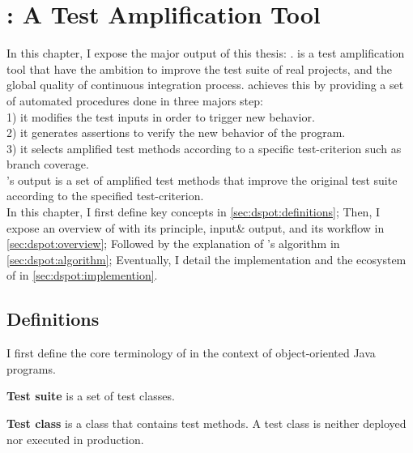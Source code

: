 \chapter{\dspot: A Test Amplification Tool}
\label{chapter:dspot}

\begin{chaptersummary}
		In this chapter, I expose the major output of this thesis: \dspot.
		\dspot is a test amplification tool that have the ambition to improve the test suite of real projects, and the global quality of continuous integration process.
		\dspot achieves this by providing a set of automated procedures done in three majors step:\\
		1) it modifies the test inputs in order to trigger new behavior.\\
		2) it generates assertions to verify the new behavior of the program.\\
		3) it selects amplified test methods according to a specific test-criterion such as branch coverage.\\
		\dspot's output is a set of amplified test methods that improve the original test suite according to the specified test-criterion.\\
		In this chapter, I first define key concepts in \autoref{sec:dspot:definitions};
		Then, I expose an overview of \dspot with its principle, input\& output, and its workflow in \autoref{sec:dspot:overview};
		Followed by the explanation of \dspot's algorithm in \autoref{sec:dspot:algorithm};
		Eventually, I detail the implementation and the ecosystem of \dspot in \autoref{sec:dspot:implemention}.
\end{chaptersummary}

\minitoc

\graphicspath{{.}{chapitres/dspot/}}

\section{Definitions}
\label{sec:dspot:definitions}

I first define the core terminology of \dspot in the context of object-oriented Java programs.

\textbf{Test suite} is a set of test classes.

\textbf{Test class} is a class that contains test methods. 
A test class is neither deployed nor executed in production.

